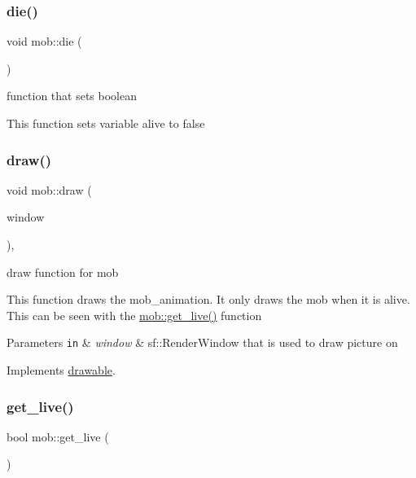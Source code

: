 \subsubsection{\texorpdfstring{die()}{die()}}
{\footnotesize\ttfamily void mob\+::die (\begin{DoxyParamCaption}{ }\end{DoxyParamCaption})}



function that sets boolean 

This function sets variable alive to false \mbox{\label{classmob_a52f5e29b2ac2d87c8c1be7e0ff5ec96b}} 
\subsubsection{\texorpdfstring{draw()}{draw()}}
{\footnotesize\ttfamily void mob\+::draw (\begin{DoxyParamCaption}\item[{sf\+::\+Render\+Window \&}]{window }\end{DoxyParamCaption})\hspace{0.3cm}{\ttfamily [override]}, {\ttfamily [virtual]}}



draw function for mob 

This function draws the mob\+\_\+animation. It only draws the mob when it is alive. This can be seen with the \hyperlink{classmob_ab327a1798c02be3f9db7c1d01b17ba02}{mob\+::get\+\_\+live()} function


\begin{DoxyParams}[1]{Parameters}
\mbox{\tt in}  & {\em window} & sf\+::\+Render\+Window that is used to draw picture on \\
\hline
\end{DoxyParams}


Implements \hyperlink{classdrawable_a4e49e2c1121704c83ce24c5f48dd910f}{drawable}.

\mbox{\label{classmob_ab327a1798c02be3f9db7c1d01b17ba02}} 
\subsubsection{\texorpdfstring{get\+\_\+live()}{get\_live()}}
{\footnotesize\ttfamily bool mob\+::get\+\_\+live (\begin{DoxyParamCaption}{ }\end{DoxyParamCaption})}



